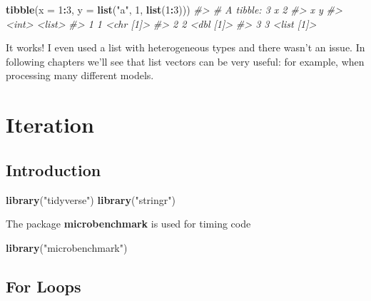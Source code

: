 \documentclass[]{book}
\newenvironment{Shaded}{\begin{snugshade}}{\end{snugshade}}
\newcommand{\CommentTok}[1]{\textcolor[rgb]{0.56,0.35,0.01}{\textit{#1}}}
\newcommand{\DataTypeTok}[1]{\textcolor[rgb]{0.13,0.29,0.53}{#1}}
\newcommand{\DecValTok}[1]{\textcolor[rgb]{0.00,0.00,0.81}{#1}}
\newcommand{\KeywordTok}[1]{\textcolor[rgb]{0.13,0.29,0.53}{\textbf{#1}}}
\newcommand{\NormalTok}[1]{#1}
\newcommand{\OperatorTok}[1]{\textcolor[rgb]{0.81,0.36,0.00}{\textbf{#1}}}
\newcommand{\StringTok}[1]{\textcolor[rgb]{0.31,0.60,0.02}{#1}}
\theoremstyle{definition}
\theoremstyle{definition}
\theoremstyle{definition}
\theoremstyle{remark}
\begin{document}
\begin{Shaded}
\begin{Highlighting}[]
\KeywordTok{tibble}\NormalTok{(}\DataTypeTok{x =} \DecValTok{1}\OperatorTok{:}\DecValTok{3}\NormalTok{, }\DataTypeTok{y =} \KeywordTok{list}\NormalTok{(}\StringTok{"a"}\NormalTok{, }\DecValTok{1}\NormalTok{, }\KeywordTok{list}\NormalTok{(}\DecValTok{1}\OperatorTok{:}\DecValTok{3}\NormalTok{)))}
\CommentTok{#> # A tibble: 3 x 2}
\CommentTok{#>       x y         }
\CommentTok{#>   <int> <list>    }
\CommentTok{#> 1     1 <chr [1]> }
\CommentTok{#> 2     2 <dbl [1]> }
\CommentTok{#> 3     3 <list [1]>}
\end{Highlighting}
\end{Shaded}

It works! I even used a list with heterogeneous types and there wasn't
an issue. In following chapters we'll see that list vectors can be very
useful: for example, when processing many different models.

\hypertarget{iteration}{%
\chapter{Iteration}\label{iteration}}

\hypertarget{introduction-13}{%
\section{Introduction}\label{introduction-13}}

\begin{Shaded}
\begin{Highlighting}[]
\KeywordTok{library}\NormalTok{(}\StringTok{"tidyverse"}\NormalTok{)}
\KeywordTok{library}\NormalTok{(}\StringTok{"stringr"}\NormalTok{)}
\end{Highlighting}
\end{Shaded}

The package \textbf{microbenchmark} is used for timing code

\begin{Shaded}
\begin{Highlighting}[]
\KeywordTok{library}\NormalTok{(}\StringTok{"microbenchmark"}\NormalTok{)}
\end{Highlighting}
\end{Shaded}

\hypertarget{for-loops}{%
\section{For Loops}\label{for-loops}}
\end{document}
